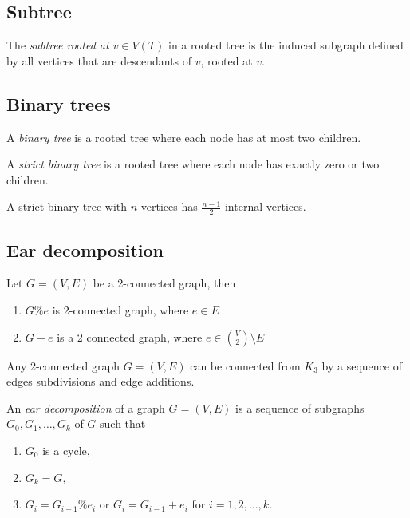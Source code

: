 \documentclass{classnotes}
\begin{document}
\subsection{Subtree}
\begin{definition}[Subtree]
    The \emph{subtree rooted at $v \in V(T)$} in a rooted tree is the induced subgraph defined by all vertices that are descendants of $v$, rooted at $v$.
\end{definition}

\subsection{Binary trees}
\begin{definition}
    A \emph{binary tree} is a rooted tree where each node has at most two children.
\end{definition}

\begin{definition}
    A \emph{strict binary tree} is a rooted tree where each node has exactly zero or two children.
\end{definition}

\begin{lemma}
    A strict binary tree with $n$ vertices has $\frac{n-1}{2}$ internal vertices.
\end{lemma}

\subsection{Ear decomposition}
\begin{lemma}
    Let $G = (V,E)$ be a 2-connected graph, then
    \begin{enumerate}
        \item $G\%e$ is 2-connected graph, where $e \in E$
        \item $G+e$ is a 2 connected graph, where $e \in \binom{V}{2}\setminus E$
    \end{enumerate}
\end{lemma}

\begin{proposition}
    Any 2-connected graph $G=(V,E)$ can be connected from $K_3$ by a sequence of edges subdivisions and edge additions.
\end{proposition}

\begin{definition}
    An \emph{ear decomposition} of a graph $G=(V,E)$ is a sequence of subgraphs $G_0,G_1,\dots,G_k$ of $G$ such that
    \begin{enumerate}
        \item $G_0$ is a cycle,
        \item $G_k = G$,
        \item $G_i = G_{i-1}\%e_i$ or $G_i = G_{i-1}+e_i$ for $i = 1,2,\dots,k$.
    \end{enumerate}
\end{definition}
\end{document}
